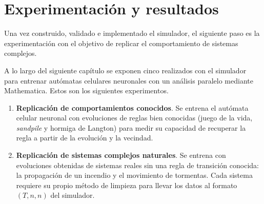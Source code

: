\chapter{Experimentación y resultados}

Una vez construido, validado e implementado el simulador, el siguiente paso es la experimentación con el objetivo de replicar el comportamiento de sistemas complejos. 

A lo largo del siguiente capítulo se exponen cinco realizados con el simulador para entrenar autómatas celulares neuronales con un análisis paralelo mediante Mathematica. Estos son los siguientes experimentos.

\begin{enumerate}
	\item \textbf{Replicación de comportamientos conocidos}. Se entrena el autómata celular neuronal con evoluciones de reglas bien conocidas (juego de la vida, \textit{sandpile} y hormiga de Langton) para medir su capacidad de recuperar la regla a partir de la evolución y la vecindad.
	\item \textbf{Replicación de sistemas complejos naturales}. Se entrena con evoluciones obtenidas de sistemas reales sin una regla de transición conocida: la propagación de un incendio y  el movimiento de  tormentas. Cada sistema requiere su propio método de limpieza para llevar los datos al formato $(T, n, n)$ del simulador.
\end{enumerate}
